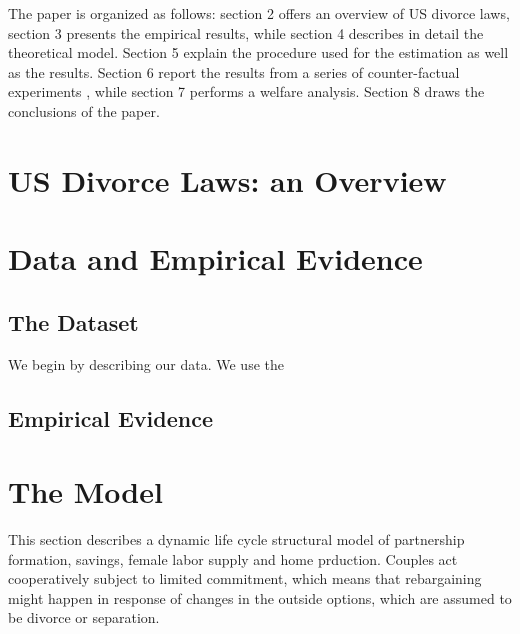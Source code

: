 \documentclass[12pt]{article}
\numberwithin{table}{section}
\begin{document}
The paper is organized as follows: section 2 offers an overview of US divorce laws, section 3 presents the empirical results, while section 4 describes in detail the theoretical model. Section 5 explain the procedure used for the estimation as well as the results. Section 6 report the results from a series of counter-factual experiments , while section 7 performs a welfare analysis. Section 8 draws the conclusions of the paper.

\section{US Divorce Laws: an Overview}
\section{Data and Empirical Evidence}
\subsection{The Dataset}
We begin by describing our data. We use the
\subsection{Empirical Evidence}
\section{The Model}
This section describes a dynamic life cycle structural model of partnership formation, savings, female labor supply and  home prduction. Couples act cooperatively subject to limited commitment, which means that rebargaining might happen in response of changes in the outside options, which are assumed to be divorce or separation.
\end{document}
